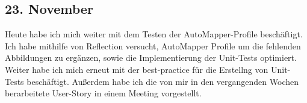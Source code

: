 \subsection{23. November}
Heute habe ich mich weiter mit dem Testen der AutoMapper-Profile beschäftigt. Ich habe mithilfe von Reflection versucht, AutoMapper Profile um die fehlenden Abbildungen zu ergänzen, sowie die Implementierung der Unit-Tests optimiert. Weiter habe ich mich erneut mit der best-practice für die Erstellng von Unit-Tests beschäftigt. Außerdem habe ich die von mir in den vergangenden Wochen berarbeitete User-Story in einem Meeting vorgestellt.
